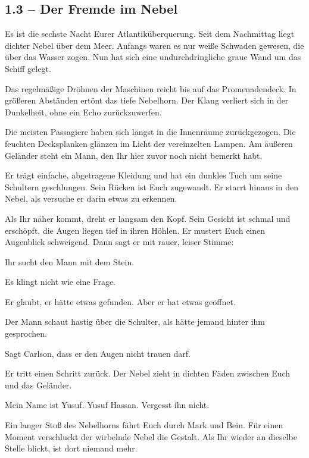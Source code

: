 \subsection{1.3 -- Der Fremde im Nebel}
\begin{vorlesetextalle}
Es ist die sechste Nacht Eurer Atlantiküberquerung. Seit dem Nachmittag liegt dichter Nebel über dem Meer. Anfangs waren es nur wei\ss{}e Schwaden gewesen, die über das Wasser zogen. Nun hat sich eine undurchdringliche graue Wand um das Schiff gelegt.

Das regelmä\ss{}ige Dröhnen der Maschinen reicht bis auf das Promenadendeck. In grö\ss{}eren Abständen ertönt das tiefe Nebelhorn. Der Klang verliert sich in der Dunkelheit, ohne ein Echo zurückzuwerfen.

Die meisten Passagiere haben sich längst in die Innenräume zurückgezogen. Die feuchten Decksplanken glänzen im Licht der vereinzelten Lampen. Am äu\ss{}eren Geländer steht ein Mann, den Ihr hier zuvor noch nicht bemerkt habt.

Er trägt einfache, abgetragene Kleidung und hat ein dunkles Tuch um seine Schultern geschlungen. Sein Rücken ist Euch zugewandt. Er starrt hinaus in den Nebel, als versuche er darin etwas zu erkennen.

Als Ihr näher kommt, dreht er langsam den Kopf. Sein Gesicht ist schmal und erschöpft, die Augen liegen tief in ihren Höhlen. Er mustert Euch einen Augenblick schweigend. Dann sagt er mit rauer, leiser Stimme:

\glqq{}Ihr sucht den Mann mit dem Stein.\grqq{}

Es klingt nicht wie eine Frage.

\glqq{}Er glaubt, er hätte etwas gefunden. Aber er hat etwas geöffnet.\grqq{}

Der Mann schaut hastig über die Schulter, als hätte jemand hinter ihm gesprochen.

\glqq{}Sagt Carlson, dass er den Augen nicht trauen darf.\grqq{}

Er tritt einen Schritt zurück. Der Nebel zieht in dichten Fäden zwischen Euch und das Geländer.

\glqq{}Mein Name ist Yusuf. Yusuf Hassan. Vergesst ihn nicht.\grqq{}

Ein langer Sto\ss{} des Nebelhorns fährt Euch durch Mark und Bein. Für einen Moment verschluckt der wirbelnde Nebel die Gestalt. Als Ihr wieder an dieselbe Stelle blickt, ist dort niemand mehr.
\end{vorlesetextalle}

